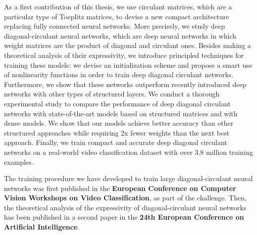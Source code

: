 
As a first contribution of this thesis, we use circulant matrices, which are a particular type of Toeplitz matrices, to devise a new compact architecture replacing fully connected neural networks.
More precisely, we study deep diagonal-circulant neural networks, which are deep neural networks in which weight matrices are the product of diagonal and circulant ones.
Besides making a theoretical analysis of their expressivity, we introduce principled techniques for training these models: we devise an initialization scheme and propose a smart use of nonlinearity functions in order to train deep diagonal circulant networks.
Furthermore, we show that these networks outperform recently introduced deep networks with other types of structured layers.
We conduct a thorough experimental study to compare the performance of deep diagonal circulant networks with state-of-the-art models based on structured matrices and with dense models.
We show that our models achieve better accuracy than other structured approaches while requiring 2x fewer weights than the next best approach.
Finally, we train compact and accurate deep diagonal circulant networks on a real-world video classification dataset with over 3.8 million training examples.

The training procedure we have developed to train large diagonal-circulant neural networks was first published in the \textbf{\color{mydarkblue} European Conference on Computer Vision Workshops on Video Classification}, as part of the \yt challenge.
Then, the theoretical analysis of the expressivity of diagonal-circulant neural networks has been published in a second paper in the \textbf{\color{mydarkblue} 24th European Conference on Artificial Intelligence}.



